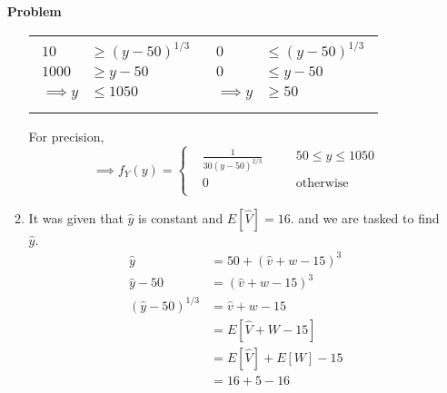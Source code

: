 \documentclass[12pt]{article}
\newenvironment{Ex}{\textbf{Problem}\vspace{.75em}\\}{}
\begin{document}
\begin{enumerate}
\begin{Ex}
\begin{solution}
\begin{enumerate}
\begin{table}[H]
          \label{eq:4b-limits}
          \begin{tabularx}{\linewidth}{XX}
            \begin{equation}
              \begin{aligned}
                10 &\ge(y-50)^{1/3} \\
                1000 &\ge y-50 \\
                \implies y &\le 1050 \\
              \end{aligned}
            \end{equation}
            &
            \begin{equation}
              \begin{aligned}
                0 &\le (y-50)^{1/3} \\
                0 &\le y-50 \\
                \implies y &\ge 50 \\
              \end{aligned}
            \end{equation}
          \end{tabularx}
        \end{table}
        For precision,
        \begin{equation}
          \label{eq:4b-sol}
          \implies f_Y(y) = \left \{
            \begin{aligned}
              & \frac{1}{30 (y-50)^{2/3}} &&\quad 50\le y\le 1050 \\
              & 0 &&\quad\text{otherwise} \\
            \end{aligned} \right.
        \end{equation}
      \item It was given that $\hat{y}$ is constant and
        $E[\hat{V}]=16$. and we are tasked to find $\hat{y}$.
        \begin{equation}
          \label{eq:4c-sol}
          \begin{aligned}
            \hat{y} &= 50 + (\hat{v} + w - 15)^3 \\
            \hat{y} - 50 &= (\hat{v} + w - 15)^3 \\
            (\hat{y} - 50)^{1/3} &= \hat{v} + w - 15 \\
            &= E[\hat{V} + W - 15] \\
            &= E[\hat{V}] + E[W] - 15 \\
            &= 16+5-16 \\

\end{aligned}
\end{equation}
\end{enumerate}
\end{solution}
\end{Ex}
\end{enumerate}
\end{document}
